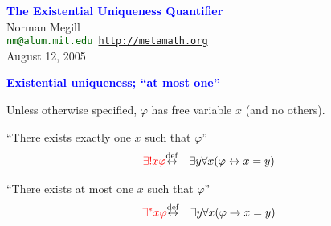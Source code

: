 \documentclass{slides}
\begin{document}
\raggedright
\pagecolor{mint}


\begin{slide}

\begin{center}
\textcolor{blue}{\textbf{\LARGE The Existential Uniqueness Quantifier}}\\
\vspace{3ex}
{\large Norman Megill}\\
\vspace{1ex}
\textcolor{darkgreen}{\texttt{nm{}@{}alum.mit.edu\qquad
\url{http://metamath.org}}}\\
\vspace{1ex}
August 12, 2005
\end{center}

\end{slide}

\begin{slide}

\begin{center}
\textcolor{blue}{\textbf{Existential
  uniqueness; ``at most one''}}
\end{center}

Unless otherwise specified, $\varphi$ has free variable $x$ (and
no others).


``There exists exactly one $x$ such that $\varphi$''
\begin{eqnarray}
 \textcolor{red}{ \exists{!} x \varphi}
       & {\buildrel\rm def\over \leftrightarrow} &
        \exists y \forall x ( \varphi
\leftrightarrow x = y ) \label{df-eu}
\end{eqnarray}


``There exists at most one $x$ such that $\varphi$''
\begin{eqnarray}
\textcolor{red}{ \exists^\ast x \varphi}
& {\buildrel\rm def\over \leftrightarrow} & \exists y \forall x ( \varphi
\rightarrow x = y ) \label{mo2}
\end{eqnarray}



\end{slide}
\end{document}
